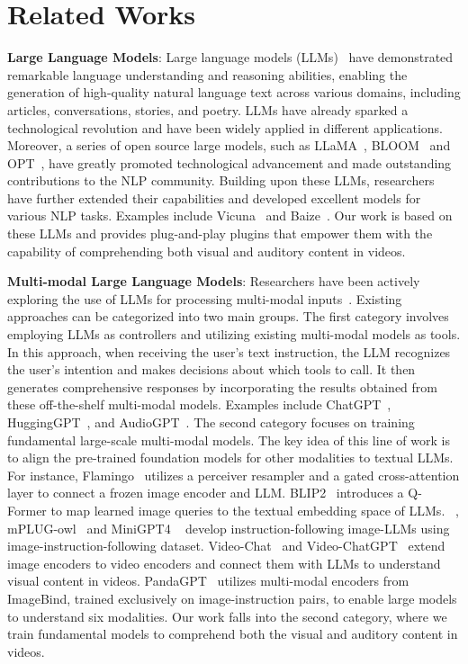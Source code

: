 \documentclass[11pt]{article}
\begin{document}
\section{Related Works}
\textbf{Large Language Models}: Large language models (LLMs)~\citep{black2022gpt, scao2022bloom, openai2023gpt4tr, tsimpoukelli2021multimodal} have demonstrated remarkable language understanding and reasoning abilities, enabling the generation of high-quality natural language text across various domains, including articles, conversations, stories, and poetry. LLMs have already sparked a technological revolution and have been widely applied in different applications. Moreover, a series of open source large models, such as LLaMA~\citep{touvron2023llama}, BLOOM~\citep{scao2022bloom} and OPT~\citep{zhang2022opt}, have greatly promoted technological advancement and made outstanding contributions to the NLP community. Building upon these LLMs, researchers have further extended their capabilities and developed excellent models for various NLP tasks. Examples include Vicuna~\citep{chiang2023vicuna} and Baize~\citep{xu2023baize}. Our work is based on these LLMs and provides plug-and-play plugins that empower them with the capability of comprehending both visual and auditory content in videos.

\textbf{Multi-modal Large Language Models}: 
Researchers have been actively exploring the use of LLMs for processing multi-modal inputs~\citep{gao2023llamaadaptervp,li2023videochatcv}. Existing approaches can be categorized into two main groups. The first category involves employing LLMs as controllers and utilizing existing multi-modal models as tools. In this approach, when receiving the user's text instruction, the LLM recognizes the user's intention and makes decisions about which tools to call. It then generates comprehensive responses by incorporating the results obtained from these off-the-shelf multi-modal models. Examples include ChatGPT~\citep{wu2023visual}, HuggingGPT~\citep{shen2023hugginggpt}, and AudioGPT~\citep{huang2023audiogpt}. 
The second category focuses on training fundamental large-scale multi-modal models. The key idea of this line of work is to align the pre-trained foundation models for other modalities to textual LLMs. For instance, Flamingo~\citep{alayrac2022flamingo} utilizes a perceiver resampler and a gated cross-attention layer to connect a frozen image encoder and LLM.
BLIP2~\citep{li2023blip2bl} introduces a Q-Former to map learned image queries to the textual embedding space of LLMs. ~\citep{liu2023visualit}, mPLUG-owl~\citep{ye2023mplugowl} and MiniGPT4 ~\citep{zhu2023minigpt} develop instruction-following image-LLMs using image-instruction-following dataset. Video-Chat~\citep{li2023videochatcv} and Video-ChatGPT~\citep{maaz2023videochatgpt} extend image encoders to video encoders and connect them with LLMs to understand visual content in videos. PandaGPT~\citep{pandagpt} utilizes multi-modal encoders from ImageBind, trained exclusively on image-instruction pairs, to enable large models to understand six modalities. Our work falls into the second category, where we train fundamental models to comprehend both the visual and auditory content in videos. 
\end{document}
